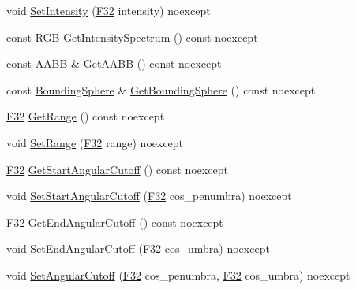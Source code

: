 \begin{DoxyCompactItemize}
\item 
void \hyperlink{classmage_1_1_spot_light_a947290df545ea2a8ef2b486898b92bd3}{Set\+Intensity} (\hyperlink{namespacemage_aa97e833b45f06d60a0a9c4fc22ae02c0}{F32} intensity) noexcept
\item 
const \hyperlink{structmage_1_1_r_g_b}{R\+GB} \hyperlink{classmage_1_1_spot_light_ad05d3abab9285f8c25ac42ee446d6e05}{Get\+Intensity\+Spectrum} () const noexcept
\item 
const \hyperlink{classmage_1_1_a_a_b_b}{A\+A\+BB} \& \hyperlink{classmage_1_1_spot_light_add184856d7fdb2ff9ae16221d9493bf5}{Get\+A\+A\+BB} () const noexcept
\item 
const \hyperlink{classmage_1_1_bounding_sphere}{Bounding\+Sphere} \& \hyperlink{classmage_1_1_spot_light_a5a2a8fcb3062256657c424d5eefe44f4}{Get\+Bounding\+Sphere} () const noexcept
\item 
\hyperlink{namespacemage_aa97e833b45f06d60a0a9c4fc22ae02c0}{F32} \hyperlink{classmage_1_1_spot_light_a19baba95ca8c5f5f6147ab0a03e6b64a}{Get\+Range} () const noexcept
\item 
void \hyperlink{classmage_1_1_spot_light_a96f8d35fe374f9d06c49d68a3ac1f213}{Set\+Range} (\hyperlink{namespacemage_aa97e833b45f06d60a0a9c4fc22ae02c0}{F32} range) noexcept
\item 
\hyperlink{namespacemage_aa97e833b45f06d60a0a9c4fc22ae02c0}{F32} \hyperlink{classmage_1_1_spot_light_a649e84aaf1f98c605f14d9597241df72}{Get\+Start\+Angular\+Cutoff} () const noexcept
\item 
void \hyperlink{classmage_1_1_spot_light_afae0adbfe0da1a897696a90294c93aef}{Set\+Start\+Angular\+Cutoff} (\hyperlink{namespacemage_aa97e833b45f06d60a0a9c4fc22ae02c0}{F32} cos\+\_\+penumbra) noexcept
\item 
\hyperlink{namespacemage_aa97e833b45f06d60a0a9c4fc22ae02c0}{F32} \hyperlink{classmage_1_1_spot_light_ad9c4cabf950619605a8040e41b9acb5b}{Get\+End\+Angular\+Cutoff} () const noexcept
\item 
void \hyperlink{classmage_1_1_spot_light_a2c200dc6f60a0c9a072680a9c5ee12d5}{Set\+End\+Angular\+Cutoff} (\hyperlink{namespacemage_aa97e833b45f06d60a0a9c4fc22ae02c0}{F32} cos\+\_\+umbra) noexcept
\item 
void \hyperlink{classmage_1_1_spot_light_aff7fad222e3c8e41d6fbeeea7f3a0893}{Set\+Angular\+Cutoff} (\hyperlink{namespacemage_aa97e833b45f06d60a0a9c4fc22ae02c0}{F32} cos\+\_\+penumbra, \hyperlink{namespacemage_aa97e833b45f06d60a0a9c4fc22ae02c0}{F32} cos\+\_\+umbra) noexcept
\item 

\end{DoxyCompactItemize}
